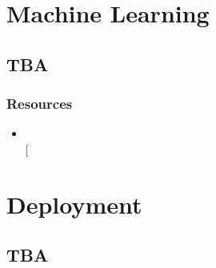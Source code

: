 \documentclass[letterpaper,10pt,english]{jupyterBook}
\begin{document}
\part{Machine Learning}

\sphinxstepscope


\chapter{TBA}
\label{\detokenize{4_Machine_Learning/Machine_Learning:tba}}\label{\detokenize{4_Machine_Learning/Machine_Learning::doc}}

\section{Resources}
\label{\detokenize{4_Machine_Learning/Machine_Learning:resources}}\begin{itemize}
\item {} 
\sphinxAtStartPar
{}\\
{[}\sphinxhref{https://doi.org/10.1007/978-3-031-38747-0}{Gareth et al. 2023}{]}

\end{itemize}

\sphinxstepscope


\part{Deployment}

\sphinxstepscope


\chapter{TBA}
\label{\detokenize{5_Deployment/Deployment:tba}}\label{\detokenize{5_Deployment/Deployment::doc}}






\renewcommand{\indexname}{Index}
\printindex
\end{document}

